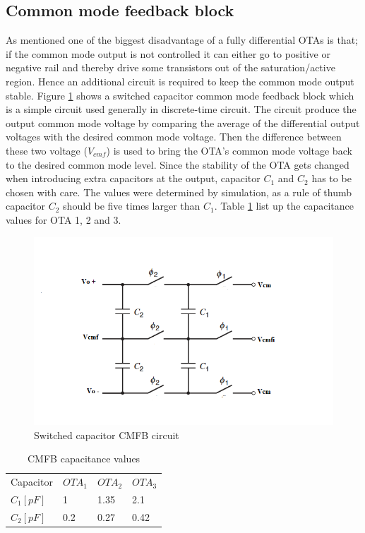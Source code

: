 \subsection{Common mode feedback block}
As mentioned one of the biggest disadvantage of a fully differential OTAs is that; if the common mode output is not controlled it can either go to positive or negative rail and thereby drive some transistors out of the saturation/active region. Hence an additional circuit is required to keep the common mode output stable. Figure \ref{cmfb} shows a switched capacitor common mode feedback block which is a simple circuit used generally in discrete-time circuit. The circuit produce the output common mode voltage by comparing the average of the differential output voltages with the desired common mode voltage. Then the difference between these two voltage ($V_{cmf}$) is used to bring the OTA's common mode voltage back to the desired common mode level. Since the stability of the OTA gets changed when introducing extra capacitors at the output, capacitor $C_1$ and $C_2$ has to be chosen with care. The values were determined by simulation, as a rule of thumb capacitor $C_2$ should be five times larger than $C_1$\cite{Johns}. Table \ref{final_cmfb} list up the capacitance values for OTA 1, 2 and 3. 
\begin{figure}[h!]
\centering
\includegraphics[scale = 0.7]{images/cmf_circuit.png}
\caption{Switched capacitor CMFB circuit\cite{Grey}}
\label{cmfb}
\end{figure}

\begin{table}[h!]
\centering
\caption{CMFB capacitance values}
\label{final_cmfb}
\begin{tabular}{l|l|l|l}
\hline
\multirow{1}{*}{Capacitor} & \multicolumn{1}{c|}{$OTA_1$} & \multicolumn{1}{c|}{$OTA_2$} & \multicolumn{1}{c}{$OTA_3$}\\\cline{1-4}
                       
            $C_1[pF]$       & 1 & 1.35 & 2.1\\
            $C_2 [pF]$      & 0.2 & 0.27 & 0.42 \\
            
\hline            
\end{tabular}
\end{table}

